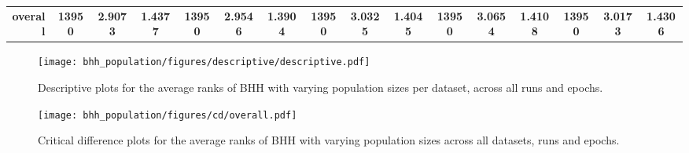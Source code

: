 \begin{table}[htbp]
{\begin{tabular}{rccccccccccccccc}
			\midrule
			\textbf{overall}                    & \textbf{13950}                          & \cellcolor[rgb]{ .776,  .937,  .808}\textcolor[rgb]{ 0,  .38,  0}{\textbf{2.9073}} & \textbf{1.4377} & \textbf{13950}                  & \textbf{2.9546}                                                           & \textbf{1.3904} & \textbf{13950}                  & \textbf{3.0325} & \textbf{1.4045} & \textbf{13950}                  & \textbf{3.0654}                                                           & \textbf{1.4108} & \textbf{13950}                  & \textbf{3.0173}                                                           & \textbf{1.4306} \\
		\end{tabular}%
	}
\end{table}%

\begin{figure}[htbp]
	\centering
	\texttt{[image: bhh\_population/figures/descriptive/descriptive.pdf]}
	\caption{Descriptive plots for the average ranks of \acs{BHH} with varying population sizes per dataset, across all runs and epochs.}
	\label{fig:results:population:descriptive:descriptive}
\end{figure}

\begin{figure}[htbp]
	\centering
	\texttt{[image: bhh\_population/figures/cd/overall.pdf]}
	\caption{Critical difference plots for the average ranks of \acs{BHH} with varying population sizes across all datasets, runs and epochs.}
	\label{fig:results:population:descriptive:cd}
\end{figure}


